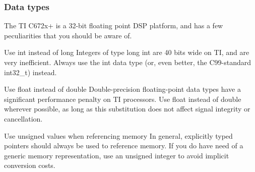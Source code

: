 \hypertarget{a00362_subsection__data_types}{}\subsubsection{Data types}\label{a00362_subsection__data_types}
The T\+I C672x+ is a 32-\/bit floating point D\+S\+P platform, and has a few peculiarities that you should be aware of.


\begin{DoxyItemize}
\item Use {\ttfamily int} instead of {\ttfamily long}  Integers of type {\ttfamily long int} are 40 bits wide on T\+I, and are very inefficient. Always use the {\ttfamily int} data type (or, even better, the C99-\/standard {\ttfamily int32\+\_\+t}) instead.  


\item Use {\ttfamily float} instead of {\ttfamily double}  Double-\/precision floating-\/point data types have a significant performance penalty on T\+I processors. Use {\ttfamily float} instead of {\ttfamily double} wherever possible, as long as this substitution does not affect signal integrity or cancellation.  


\item Use unsigned values when referencing memory  In general, explicitly typed pointers should always be used to reference memory. If you do have need of a generic memory representation, use an unsigned integer to avoid implicit conversion costs.  


\end{DoxyItemize}

